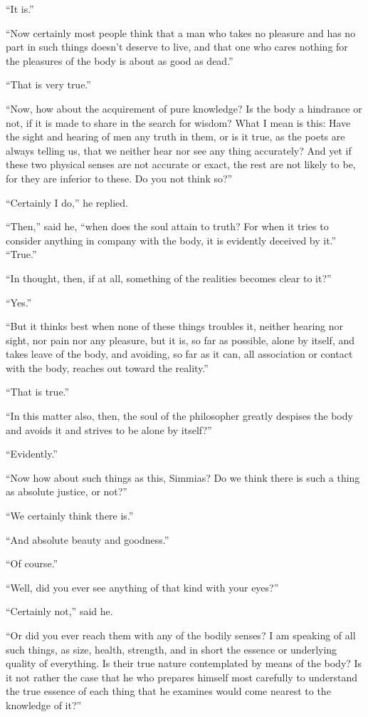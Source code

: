 \documentclass[letterpaper,12pt]{article}
\newcommand{\stephpag}[1]{\marginnote{\small\itshape\fontfamily{ppl}\selectfont #1}}
\begin{document}
\begin{drama}
``It is.''
 
``Now certainly most people think that a man who takes no pleasure and has no part in such things doesn't deserve to live, and that one who cares nothing for the pleasures of the body is about as good as dead.''
 
``That is very true.''
 
``Now, how about the acquirement of pure knowledge? Is the body a hindrance or not, if it is made to share in the search for wisdom? \stephpag{b} What I mean is this: Have the sight and hearing of men any truth in them, or is it true, as the poets are always telling us, that we neither hear nor see any thing accurately? And yet if these two physical senses are not accurate or exact, the rest are not likely to be, for they are inferior to these. Do you not think so?''
 
``Certainly I do,'' he replied.
 
``Then,'' said he, ``when does the soul attain to truth? For when it tries to consider anything in company with the body, it is evidently deceived by it.'' \stephpag{c} ``True.''
 
``In thought, then, if at all, something of the realities becomes clear to it?''
 
``Yes.''
 
``But it thinks best when none of these things troubles it, neither hearing nor sight, nor pain nor any pleasure, but it is, so far as possible, alone by itself, and takes leave of the body, and avoiding, so far as it can, all association or contact with the body, reaches out toward the reality.''
 
``That is true.''
 
``In this matter also, then, \stephpag{d} the soul of the philosopher greatly despises the body and avoids it and strives to be alone by itself?''
 
``Evidently.''
 
``Now how about such things as this, Simmias? Do we think there is such a thing as absolute justice, or not?''
 
``We certainly think there is.''
 
``And absolute beauty and goodness.''
 
``Of course.''
 
``Well, did you ever see anything of that kind with your eyes?''
 
``Certainly not,'' said he.
 
``Or did you ever reach them with any of the bodily senses? I am speaking of all such things, as size, health, strength, and in short the essence \stephpag{e} or underlying quality of everything. Is their true nature contemplated by means of the body? Is it not rather the case that he who prepares himself most carefully to understand the true essence of each thing that he examines would come nearest to the knowledge of it?''
 

\end{drama}
\end{document}
